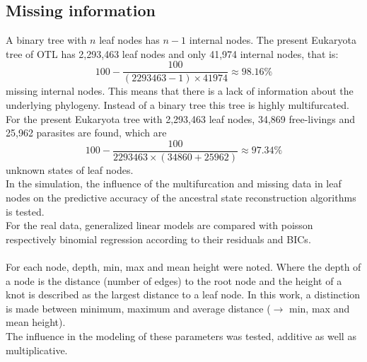     \subsection{Missing information}

      A binary tree with $n$ leaf nodes has $n-1$ internal nodes. The present Eukaryota tree of OTL has 
        2,293,463 leaf nodes and only 41,974 internal nodes, that is:
      $$100-\frac{100}{(2293463-1) \times 41974} \approx 98.16 \%$$
        missing internal nodes. This means that there is a lack of information about the underlying 
        phylogeny. Instead of a binary tree this tree is highly multifurcated. \\


      For the present Eukaryota tree with 2,293,463 leaf nodes, 34,869 free-livings and 25,962 parasites 
        are found, which are
        $$100-\frac{100}{2293463 \times (34860+25962)} \approx 97.34 \%$$
        unknown states of leaf nodes. \\

      In the simulation, the influence of the multifurcation and missing data in leaf nodes on the 
        predictive accuracy of the ancestral state reconstruction algorithms is tested. \\
      For the real data, generalized linear models are compared with poisson respectively binomial 
        regression according to their residuals and BICs. \\
       \\

      For each node, depth, min, max and mean height were noted. Where the depth of a node is the 
        distance (number of edges) to the root node and the height of a knot is described as the 
        largest distance to a leaf node. In this work, a distinction is made between minimum, maximum 
        and average distance ($\rightarrow$ min, max and mean height). \\
      The influence in the modeling of these parameters was tested, additive as well as multiplicative.

